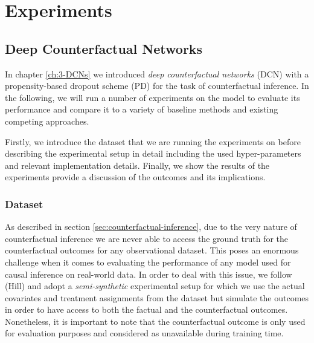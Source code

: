 %

\chapter{\label{ch:5-experiments}Experiments} 


\section{Deep Counterfactual Networks}
In chapter \ref{ch:3-DCNs} we introduced \emph{deep counterfactual networks} (DCN) with a propensity-based dropout scheme (PD) for the task of counterfactual inference. In the following, we will run a number of experiments on the model to evaluate its performance and compare it to a variety of baseline methods and existing competing approaches. 

Firstly, we introduce the dataset that we are running the experiments on before describing the experimental setup in detail including the used hyper-parameters and relevant implementation details. Finally, we show the results of the experiments provide a discussion of the outcomes and its implications.  

\subsection{Dataset}
As described in section \ref{sec:counterfactual-inference}, due to the very nature of counterfactual inference we are never able to access the ground truth for the counterfactual outcomes for any observational dataset. This poses an enormous challenge when it comes to evaluating the performance of any model used for causal inference on real-world data. In order to deal with this issue, we follow (Hill) %
and adopt a \emph{semi-synthetic} experimental setup for which we use the actual covariates and treatment assignments from the dataset but simulate the outcomes in order to have access to both the factual and the counterfactual outcomes. Nonetheless, it is important to note that the counterfactual outcome is only used for evaluation purposes and considered as unavailable during training time. 

